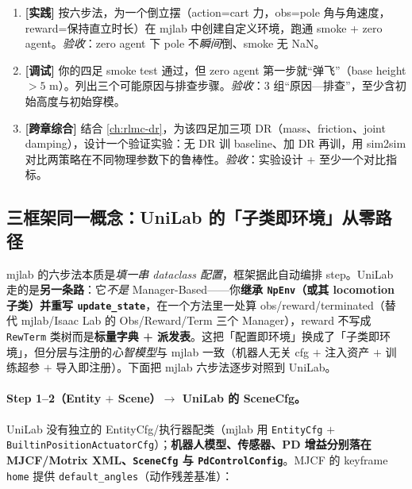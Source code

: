 \begin{practice}
\begin{enumerate}
\item \textbf{[实践]} 按六步法，为一个倒立摆（action=cart 力，obs=pole 角与角速度，reward=保持直立时长）在 mjlab 中创建自定义环境，跑通 smoke + zero agent。\emph{验收}：zero agent 下 pole 不\emph{瞬间}倒、smoke 无 NaN。
\item \textbf{[调试]} 你的四足 smoke test 通过，但 zero agent 第一步就“弹飞”（base height $>5$ m）。列出三个可能原因与排查步骤。\emph{验收}：3 组“原因—排查”，至少含初始高度与初始穿模。
\item \textbf{[跨章综合]} 结合 \cref{ch:rlmc-dr}，为该四足加三项 DR（mass、friction、joint damping），设计一个验证实验：无 DR 训 baseline、加 DR 再训，用 sim2sim 对比两策略在不同物理参数下的鲁棒性。\emph{验收}：实验设计 + 至少一个对比指标。
\end{enumerate}
\end{practice}

\subsection{三框架同一概念：UniLab 的「子类即环境」从零路径}
\label{sec:rlmc-diy-mjlab-unilab}

mjlab 的六步法本质是\emph{填一串 dataclass 配置}，框架据此自动编排 step。UniLab 走的是\textbf{另一条路}：它\emph{不是} Manager-Based——你\textbf{继承 \texttt{NpEnv}（或其 locomotion 子类）并重写 \texttt{update\_state}}，在一个方法里一处算 obs/reward/terminated（替代 mjlab/Isaac Lab 的 Obs/Reward/Term 三个 Manager），reward 不写成 \verb|RewTerm| 类树而是\textbf{标量字典 + 派发表}。这把「配置即环境」换成了「子类即环境」，但分层与注册的\emph{心智模型}与 mjlab 一致（机器人无关 cfg $+$ 注入资产 $+$ 训练超参 $+$ 导入即注册）。下面把 mjlab 六步法逐步对照到 UniLab。

\paragraph{Step 1--2（Entity $+$ Scene）$\to$ UniLab 的 SceneCfg。}UniLab 没有独立的 EntityCfg/执行器配类（mjlab 用 \texttt{EntityCfg} $+$ \texttt{BuiltinPositionActuatorCfg}）；\textbf{机器人模型、传感器、PD 增益分别落在 MJCF/Motrix XML、\texttt{SceneCfg} 与 \texttt{PdControlConfig}}。MJCF 的 keyframe \verb|home| 提供 \verb|default_angles|（动作残差基准）：

